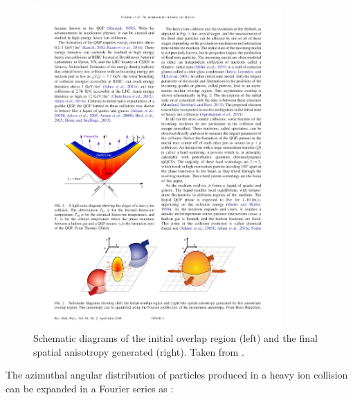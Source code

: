 \begin{figure}[htbp]
\begin{center}
\includegraphics[width=0.85\textwidth]{figures/theory/overlap}
\caption{Schematic diagrams of the initial overlap region (left) and the final spatial anisotropy generated (right).
Taken from \cite{RevModPhys.90.025005}.}
\label{fig:overlap}
\end{center}
\end{figure}



The azimuthal angular distribution of particles produced in a heavy ion collision can be expanded in a Fourier series as \cite{Poskanzer:1998yz}: 

